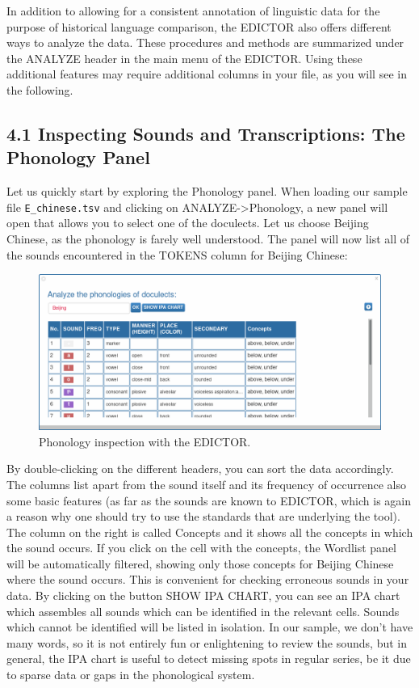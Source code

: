 \documentclass[a4paper,svgnames]{scrartcl}
\begin{document}
In addition to allowing for a consistent annotation of linguistic data
for the purpose of historical language comparison, the EDICTOR also
offers different ways to analyze the data. These procedures and methods
are summarized under the ANALYZE header in the main menu of the EDICTOR.
Using these additional features may require additional columns in your
file, as you will see in the following.

\subsection*{4.1 Inspecting Sounds and Transcriptions: The Phonology
Panel}\label{inspecting-sounds-and-transcriptions-the-phonology-panel}

Let us quickly start by exploring the Phonology panel. When loading our
sample file \texttt{E\_chinese.tsv} and clicking on
ANALYZE-\textgreater{}Phonology, a new panel will open that allows you
to select one of the doculects. Let us choose Beijing Chinese, as the
phonology is farely well understood. The panel will now list all of the
sounds encountered in the TOKENS column for Beijing Chinese:

\begin{figure}
\centering
\includegraphics{images/figure-15.png}
\caption{Phonology inspection with the EDICTOR.}
\end{figure}

By double-clicking on the different headers, you can sort the data
accordingly. The columns list apart from the sound itself and its
frequency of occurrence also some basic features (as far as the sounds
are known to EDICTOR, which is again a reason why one should try to use
the standards that are underlying the tool). The column on the right is
called Concepts and it shows all the concepts in which the sound occurs.
If you click on the cell with the concepts, the Wordlist panel will be
automatically filtered, showing only those concepts for Beijing Chinese
where the sound occurs. This is convenient for checking erroneous sounds
in your data. By clicking on the button SHOW IPA CHART, you can see an
IPA chart which assembles all sounds which can be identified in the
relevant cells. Sounds which cannot be identified will be listed in
isolation. In our sample, we don't have many words, so it is not
entirely fun or enlightening to review the sounds, but in general, the
IPA chart is useful to detect missing spots in regular series, be it due
to sparse data or gaps in the phonological system.
\end{document}
